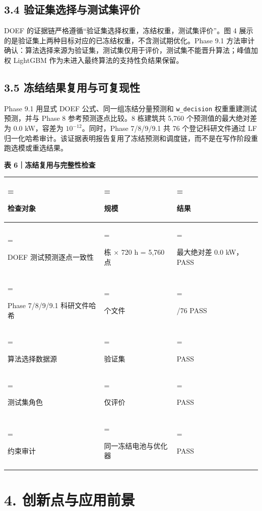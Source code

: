 \documentclass[12pt,a4paper]{article}
\begin{document}
\subsection{3.4 验证集选择与测试集评价}
DOEF 的证据链严格遵循“验证集选择权重，冻结权重，测试集评价”。图 4 展示的是验证集上两种目标对应的已冻结权重，不含测试期优化。Phase 9.1 方法审计确认：算法选择来源为验证集，测试集仅用于评价，测试集不能晋升算法；峰值加权 LightGBM 作为未进入最终算法的支持性负结果保留。\par
\subsection{3.5 冻结结果复用与可复现性}
Phase 9.1 用显式 DOEF 公式、同一组冻结分量预测和 \nolinkurl{w_decision} 权重重建测试预测，并与 Phase 8 参考预测逐点比较。8 栋建筑共 5,760 个预测值的最大绝对差为 0.0 kW，容差为 \(10^{-12}\)。同时，Phase 7/8/9/9.1 共 76 个登记科研文件通过 LF 归一化哈希审计。该证据表明报告复用了冻结预测和调度链，而不是在写作阶段重跑选模或重选结果。\par
\par\noindent\begin{minipage}{\linewidth}\textbf{表 6｜冻结复用与完整性检查}\par\smallskip\renewcommand{\arraystretch}{1.2}\begin{tabularx}{\linewidth}{>{\hsize=1.4\hsize\linewidth=\hsize\raggedright\arraybackslash}X>{\hsize=0.8\hsize\linewidth=\hsize\raggedright\arraybackslash}X>{\hsize=0.8\hsize\linewidth=\hsize\raggedright\arraybackslash}X}\toprule
检查对象 & 规模 & 结果\\\midrule
DOEF 测试预测逐点一致性 & 8 栋 × 720 h = 5,760 点 & 最大绝对差 0.0 kW，PASS\\
Phase 7/8/9/9.1 科研文件哈希 & 76 个文件 & 76/76 PASS\\
算法选择数据源 & 验证集 & PASS\\
测试集角色 & 仅评价 & PASS\\
约束审计 & 同一冻结电池与优化器 & PASS\\
\bottomrule\end{tabularx}\end{minipage}\par
\section{4. 创新点与应用前景}
\end{document}
